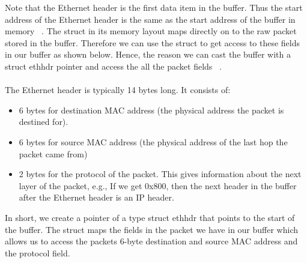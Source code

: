 Note that the Ethernet header is the first data item in the buffer. Thus the start address of the Ethernet header is the same as the start address of the buffer in memory ~\cite{1}. The struct in its memory layout maps directly on to the raw packet stored in the buffer. Therefore we can use the struct to get access to these fields in our buffer as shown below. Hence, the reason we can cast the buffer with a struct ethhdr pointer and access the all the packet fields ~\cite{38}.\\

\\

The Ethernet header is typically 14 bytes long. It consists of:

\begin{itemize}
\item 6 bytes for destination MAC address (the physical address the packet is destined for).
\item 6 bytes for source MAC address (the physical address of the last hop the packet came from)
\item 2 bytes for the protocol of the packet. This gives information about the next layer of the packet, e.g., If we get 0x800, then the next header in the buffer after the Ethernet header is an IP header. \\
\end{itemize}

In short, we create a pointer of a type struct ethhdr that points to the start of the buffer. The struct maps the fields in the packet we have in our buffer which allows us to access the packets 6-byte destination and source MAC address and the protocol field. 


